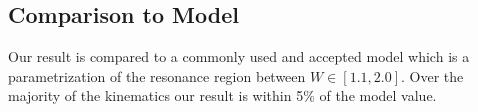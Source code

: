 \subsection{Comparison to Model}
Our result is compared to a commonly used and accepted model which is a parametrization of the resonance region between $W \in [1.1, 2.0]$.  Over the majority of the kinematics our result is within 5\% of the model value.  



